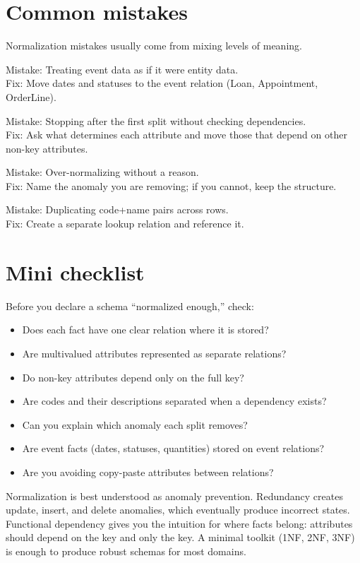 \section{Common mistakes}
Normalization mistakes usually come from mixing levels of meaning.

Mistake: Treating event data as if it were entity data.\\
Fix: Move dates and statuses to the event relation (Loan, Appointment, OrderLine).

Mistake: Stopping after the first split without checking dependencies.\\
Fix: Ask what determines each attribute and move those that depend on other non-key attributes.

Mistake: Over-normalizing without a reason.\\
Fix: Name the anomaly you are removing; if you cannot, keep the structure.

Mistake: Duplicating code+name pairs across rows.\\
Fix: Create a separate lookup relation and reference it.

\section{Mini checklist}
Before you declare a schema “normalized enough,” check:
\begin{itemize}[leftmargin=*,nosep]
  \item Does each fact have one clear relation where it is stored?
  \item Are multivalued attributes represented as separate relations?
  \item Do non-key attributes depend only on the full key?
  \item Are codes and their descriptions separated when a dependency exists?
  \item Can you explain which anomaly each split removes?
  \item Are event facts (dates, statuses, quantities) stored on event relations?
  \item Are you avoiding copy-paste attributes between relations?
\end{itemize}

\begin{chaptersummary}
Normalization is best understood as anomaly prevention.
Redundancy creates update, insert, and delete anomalies, which eventually produce incorrect states.
Functional dependency gives you the intuition for where facts belong: attributes should depend on the key and only the key.
A minimal toolkit (1NF, 2NF, 3NF) is enough to produce robust schemas for most domains.
\end{chaptersummary}


